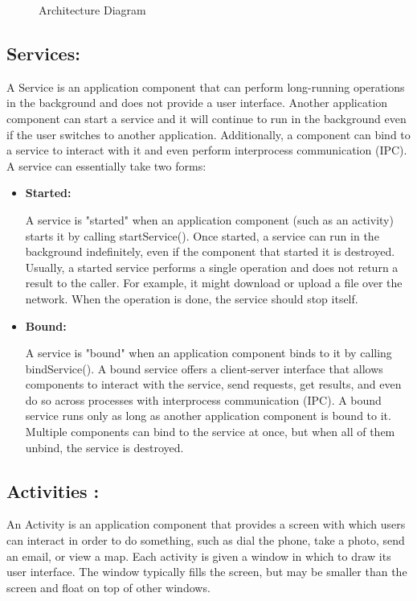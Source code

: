 \documentclass[12pt,a4paper]{report}
\begin{document}
\newpage
\begin{figure}[h]
	\begin{center}
		\caption{Architecture Diagram}
	\end{center}
\end{figure}

\subsection{Services:}

A Service is an application component that can perform long-running operations in the background and does not provide a user interface. Another application component can start a service and it will continue to run in the background even if the user switches to another application. Additionally, a component can bind to a service to interact with it and even perform interprocess communication (IPC). 
A service can essentially take two forms:
\begin{itemize}
	\item \textbf{Started:}
	
	\hspace{0.5in}A service is "started" when an application component (such as an activity) starts it by calling startService(). Once started, a service can run in the background indefinitely, even if the component that started it is destroyed. Usually, a started service performs a single operation and does not return a result to the caller. For example, it might download or upload a file over the network. When the operation is done, the service should stop itself.
	\item \textbf{Bound:}
	
	\hspace{0.5in}A service is "bound" when an application component binds to it by calling bindService(). A bound service offers a client-server interface that allows components to interact with the service, send requests, get results, and even do so across processes with interprocess communication (IPC). A bound service runs only as long as another application component is bound to it. Multiple components can bind to the service at once, but when all of them unbind, the service is destroyed.
	
\end{itemize}

\subsection{Activities :}
An Activity is an application component that provides a screen with which users can interact in order to do something, such as dial the phone, take a photo, send an email, or view a map. Each activity is given a window in which to draw its user interface. The window typically fills the screen, but may be smaller than the screen and float on top of other windows.
\end{document}
